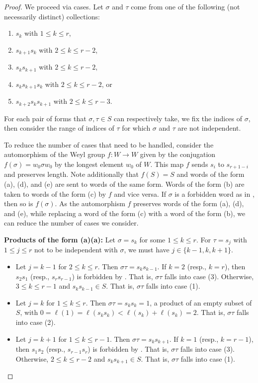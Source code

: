 \documentclass[10pt,a4paper]{amsart}
\begin{document}
\begin{proof}
    We proceed via cases. Let $\sigma$ and $\tau$ come from one of the following (not necessarily distinct) collections:
\begin{enumerate}
        \item[(a)] $s_k$ with $1 \le k \le r$,
        \item[(b)] $s_{k+1}s_{k}$ with $2 \le k \le r-2$,
        \item[(c)] $s_{k}s_{k+1}$ with $2 \le k \le r-2$, 
        \item[(d)] $s_{k}s_{k+1}s_{k}$ with $2 \le k \le r-2$, or
        \item[(e)] $s_{k+2}s_{k}s_{k+1}$ with $2 \le k \le r-3$.
    \end{enumerate}
    For each pair of forms that $\sigma, \tau\in S$ can respectively take, we fix the indices of $\sigma$, then consider the range of indices of $\tau$ for which $\sigma$ and $\tau$ are not independent.

    To reduce the number of cases that need to be handled, consider the automorphism of the Weyl group $f:W\to W$ given by the conjugation $f(\sigma)=w_0\sigma w_0$ by the longest element $w_0$ of $W$. This map $f$ sends $s_i$ to $s_{r+1-i}$ and preserves length.  
    Note additionally that $f(S)=S$ and words of the form (a), (d), and (e) are sent to words of the same form. Words of the form (b) are taken to words of the form (c) by $f$ and vice versa. If $\sigma$ is a forbidden word as in , then so is $f(\sigma)$. 
    As the automorphism $f$ preserves words of the form (a), (d), and (e), while replacing a word of the form (c) with a word of the form (b), we can reduce the number of cases we consider.
\smallskip

\noindent \textbf{Products of the form (a)(a):}
    Let $\sigma = s_k$ for some $1 \leq k \leq r$. For $\tau = s_{j}$ with $1\leq j\leq r$ not to be independent with $\sigma$, we must have $j\in\{k-1,k,k+1\}$.
    \begin{itemize}
        \item Let $j=k-1$ for $2\leq k\leq r$. Then $\sigma\tau=s_ks_{k-1}$. If $k=2$ (resp., $k=r$), then $s_2s_1$ (resp., $s_rs_{r-1}$) is forbidden by . That is, $\sigma\tau$ falls into case (3). Otherwise, $3\leq k\leq r-1$ and $s_ks_{k-1}\in S$. That is, $\sigma\tau$ falls into case (1). 
        \item Let $j=k$ for $1\leq k\leq r$. Then $\sigma\tau=s_ks_k=1$, a product of an empty subset of $S$, with $0=\ell(1)=\ell(s_ks_{k})<\ell(s_k)+\ell(s_{k})=2$. That is, $\sigma\tau$ falls into case (2).
        \item Let $j=k+1$ for $1\leq k\leq r-1$. Then $\sigma\tau=s_ks_{k+1}$. If $k=1$ (resp., $k=r-1$), then $s_1s_2$ (resp., $s_{r-1}s_r$) is forbidden by . That is, $\sigma\tau$ falls into case (3). Otherwise, $2\leq k\leq r-2$ and $s_ks_{k+1}\in S$. That is, $\sigma\tau$ falls into case (1).
    \end{itemize}
\smallskip


\end{proof}
\end{document}
